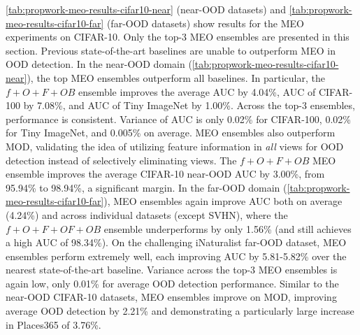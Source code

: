 \ref{tab:propwork-meo-results-cifar10-near} (near-OOD datasets) and \ref{tab:propwork-meo-results-cifar10-far} (far-OOD datasets) show results for the MEO experiments on CIFAR-10. Only the top-3 MEO ensembles are presented in this section. Previous state-of-the-art baselines are unable to outperform MEO in OOD detection. 
In the near-OOD domain (\ref{tab:propwork-meo-results-cifar10-near}), the top MEO ensembles outperform all baselines. In particular, the $f+O+F+OB$ ensemble improves the average AUC by 4.04\%, AUC of CIFAR-100 by 7.08\%, and AUC of Tiny ImageNet by 1.00\%. Across the top-3 ensembles, performance is consistent. Variance of AUC is only 0.02\% for CIFAR-100, 0.02\% for Tiny ImageNet, and 0.005\% on average. MEO ensembles also outperform MOD, validating the idea of utilizing feature information in \emph{all} views for OOD detection instead of selectively eliminating views. The $f+O+F+OB$ MEO ensemble improves the average CIFAR-10 near-OOD AUC by 3.00\%, from 95.94\% to 98.94\%, a significant margin.
In the far-OOD domain (\ref{tab:propwork-meo-results-cifar10-far}), MEO ensembles again improve AUC both on average (4.24\%) and across individual datasets (except SVHN), where the $f+O+F+OF+OB$ ensemble underperforms by only 1.56\% (and still achieves a high AUC of 98.34\%). On the challenging iNaturalist far-OOD dataset, MEO ensembles perform extremely well, each improving AUC by 5.81-5.82\% over the nearest state-of-the-art baseline. Variance across the top-3 MEO ensembles is again low, only 0.01\% for average OOD detection performance. Similar to the near-OOD CIFAR-10 datasets, MEO ensembles improve on MOD, improving average OOD detection by 2.21\% and demonstrating a particularly large increase in Places365 of 3.76\%.
